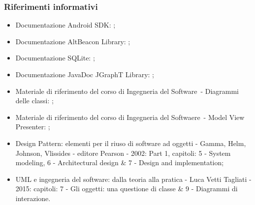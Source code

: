 \documentclass[../DefinizioneDiProdotto.tex]{subfiles}
\begin{document}
		\subsubsection{Riferimenti informativi}
		\begin{itemize}
			\item Documentazione Android SDK: ;
			\item Documentazione AltBeacon Library: ;
			\item Documentazione SQLite: ;
			\item Documentazione JavaDoc JGraphT Library: ;
			\item Materiale di riferimento del corso di Ingegneria del Software\g\ - Diagrammi delle classi: ;
			\item Materiale di riferimento del corso di Ingegneria del Softwaere\g\ - Model View Presenter: ;
			\item Design Pattern: elementi per il riuso di software ad oggetti - Gamma, Helm, Johnson, Vlissides - editore Pearson - 2002: Part 1, capitoli: 5 - System modeling, 6 - Architectural design \& 7 - Design and implementation;
			\item UML e ingegneria del software: dalla teoria alla pratica - Luca Vetti Tagliati - 2015: capitoli: 7 - Gli oggetti: una questione di classe \& 9 - Diagrammi di interazione.
		\end{itemize}
		
\end{document}
